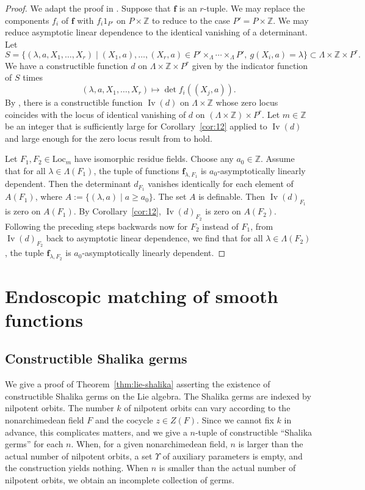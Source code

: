 \documentclass[12pt]{amsart}
\newcommand{\op}[1]{\operatorname{#1}}
\newcommand{\ring}[1]{{\mathbb #1}}
\newcommand{\locus}[1]{\op{Iv}(#1)}
\def\Y{\Upsilon}
\def\bf{\mathbf f}
\newcommand{\Loc}{\mathrm{Loc}}
\theoremstyle{plain}
\theoremstyle{definition}
\begin{document}
\begin{proof} We adapt the proof in \cite{CGH2}. Suppose that $\bf$ is
  an $r$-tuple.  We may replace the components $f_i$ of $\bf$ with
  $f_i 1_{P'}$ on $P\times\ring{Z}$ to reduce to the case
  $P'=P\times\ring{Z}$.  We may reduce asymptotic linear dependence to
  the identical vanishing of a determinant.  Let
\[
S = \{(\lambda,a,X_1,\ldots,X_r)\mid (X_1,a),\ldots,(X_r,a)\in P'\times_\Lambda
\cdots\times_\Lambda 
P',~g(X_i,a)= \lambda\} \subset \Lambda\times\ring{Z}\times P^{r}.
\]
We have a constructible function $d$ on $\Lambda\times\ring{Z}\times P^{r}$
given by the indicator function of $S$ times
\[
(\lambda,a,X_1,\ldots,X_r)\mapsto 
\det f_i((X_j,a)).
\]
By \cite{CGH1}, there is a constructible function $\locus{d}$ on
$\Lambda\times\ring{Z}$ whose zero locus coincides with the locus of
identical vanishing of $d$ on $(\Lambda\times\ring{Z})\times P^r$.
Let $m\in\ring{Z}$ be an integer that is sufficiently large for
Corollary~\ref{cor:12} applied to $\locus{d}$ and large enough for the
zero locus result from \cite{CGH1} to hold.

Let $F_1,F_2\in\Loc_m$ have isomorphic residue fields.  Choose any
$a_0\in\ring{Z}$.  Assume that for all $\lambda\in \Lambda(F_1)$, the
tuple of functions $\bf_{\lambda,F_1}$ is $a_0$-asymptotically
linearly dependent.  Then the determinant $d_{F_1}$ vanishes
identically for each element of $A(F_1)$, where $A:=\{(\lambda,a)\mid
a\ge a_0\}$.  The set $A$ is definable.  Then $\locus{d}_{F_1}$ is
zero on $A(F_1)$.  By Corollary~\ref{cor:12}, $\locus{d}_{F_2}$ is
zero on $A(F_2)$.  Following the preceding steps backwards now for
$F_2$ instead of $F_1$, from $\locus{d}_{F_2}$ back to asymptotic
linear dependence, we find that for all $\lambda\in\Lambda(F_2)$, the
tuple $\bf_{\lambda,F_2}$ is $a_0$-asymptotically linearly dependent.
\end{proof}



\section{Endoscopic matching of smooth functions}


\subsection{Constructible Shalika germs}\label{sec:msg}

We give a proof of Theorem~\ref{thm:lie-shalika} asserting the
existence of constructible Shalika germs on the Lie algebra.  The
Shalika germs are indexed by nilpotent orbits. The number $k$ of
nilpotent orbits can vary according to the nonarchimedean field $F$
and the cocycle $z\in Z(F)$.  Since we cannot fix $k$ in advance, this
complicates matters, and we give a $n$-tuple of constructible
``Shalika germs'' for each $n$.  When, for a given nonarchimedean
field, $n$ is larger than the actual number of nilpotent orbits, a set
$\Y$ of auxiliary parameters is empty, and the construction yields
nothing.  When $n$ is smaller than the actual number of nilpotent
orbits, we obtain an incomplete collection of germs.
\end{document}
